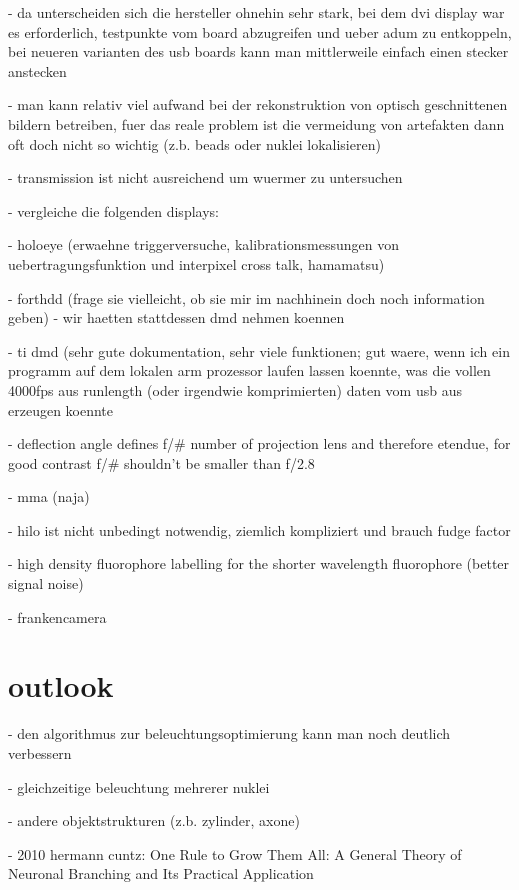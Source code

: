 \documentclass[oneside,a4paper,12pt,BCOR20mm,DIV14]{scrbook} %
\begin{document}
  - da unterscheiden sich die hersteller ohnehin sehr stark, bei dem
    dvi display war es erforderlich, testpunkte vom board abzugreifen
    und ueber adum zu entkoppeln, bei neueren varianten des usb boards
    kann man mittlerweile einfach einen stecker anstecken

- man kann relativ viel aufwand bei der rekonstruktion von optisch
  geschnittenen bildern betreiben, fuer das reale problem ist die
  vermeidung von artefakten dann oft doch nicht so wichtig (z.b. beads
  oder nuklei lokalisieren)

- transmission ist nicht ausreichend um wuermer zu untersuchen  

- vergleiche die folgenden displays:

  - holoeye (erwaehne triggerversuche, kalibrationsmessungen von
    uebertragungsfunktion und interpixel cross talk, hamamatsu)

  - forthdd (frage sie vielleicht, ob sie mir im nachhinein doch noch
    information geben)
  - wir haetten stattdessen dmd nehmen koennen

  - ti dmd (sehr gute dokumentation, sehr viele funktionen; gut waere,
    wenn ich ein programm auf dem lokalen arm prozessor laufen lassen
    koennte, was die vollen 4000fps aus runlength (oder irgendwie
    komprimierten) daten vom usb aus erzeugen koennte

    - deflection angle defines f/\# number of projection lens and
      therefore etendue, for good contrast f/\# shouldn't be smaller
      than f/2.8

  - mma (naja)

  

- hilo ist nicht unbedingt notwendig, ziemlich kompliziert und brauch
  fudge factor

  - high density fluorophore labelling for the shorter wavelength
  fluorophore (better signal noise)

- frankencamera
\chapter{outlook}
\label{sec:outlook}
- den algorithmus zur beleuchtungsoptimierung kann man noch deutlich
  verbessern

  - gleichzeitige beleuchtung mehrerer nuklei

  - andere objektstrukturen (z.b. zylinder, axone)

    - 2010 hermann cuntz: One Rule to Grow Them All: A General Theory
      of Neuronal Branching and Its Practical Application
\end{document}
